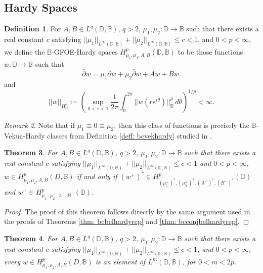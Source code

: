 \documentclass[12pt,reqno]{amsart}
\newtheorem{theorem}{Theorem}[section]
\theoremstyle{definition}
\newtheorem{deff}[theorem]{Definition}
\theoremstyle{remark}
\newtheorem{comm}[theorem]{Remark}
\newcommand{\p}{\partial}
\newcommand{\dbar}{\bar\partial}
\newcommand{\bc}{\mathbb{B}}
\newcommand{\disk}{\mathbb{D}}
\begin{document}
    \subsection{Hardy Spaces}

\begin{deff}
For $A, B \in L^q(\disk,\bc)$, $q>2$, $\mu_1,\mu_2 : \disk \to \bc$ such that there exists a real constant $c$ satisfying $||\mu_1||_{L^\infty(\disk,\bc)}+||\mu_2||_{L^\infty(\disk,\bc)} \leq c < 1$, and $0 < p < \infty$, we define the $\bc$-GFOE-Hardy spaces $H^p_{\mu_1, \mu_2, A, B}(\disk,\bc)$ to be those functions $w: \disk\to\bc$ such that 
    \[
        \dbar w = \mu_1  \p w + \mu_2 \dbar \overline{w} + Aw + B\overline{w}.
    \]
and 
    \[
        ||w||_{H^p_{\bc}} := \left( \sup_{0< r < 1} \frac{1}{2\pi}\int_0^{2\pi} ||w(re^{i\theta})||_{\bc}^p\,d\theta\right)^{1/p} < \infty.
    \]
\end{deff}

\begin{comm}
    Note that if $\mu_1 \equiv 0 \equiv \mu_2$, then this class of functions is precisely the $\bc$-Vekua-Hardy classes from Definition \ref{deff: bcvekhardy} studied in \cite{BCHoiv, BCHarmVek}.
\end{comm}

\begin{theorem}\label{thm: bcgfoehardyrep}
    For $A, B \in L^q(\disk,\bc)$, $q>2$, $\mu_1,\mu_2 : \disk \to \bc$ such that there exists a real constant $c$ satisfying $||\mu_1||_{L^\infty(\disk,\bc)}+||\mu_2||_{L^\infty(\disk,\bc)} \leq c < 1$ and $0 < p < \infty$, $w \in H^p_{\mu_1,\mu_2,A,B}(D,\bc)$ if and only if $(w^+)^* \in H^p_{(\mu_1^+)^*, (\mu_2^+)^*, (A^+)^*, (B^+)^*}(\disk)$ and $w^- \in H^p_{\mu_1^-, \mu_2^-, A^-, B^-}(\disk)$. 
\end{theorem}

\begin{proof}
The proof of this theorem follows directly by the same argument used in the proofs of Theorems \ref{thm: bcbelhardyrep} and \ref{thm: bcconjbelhardyrep}. 
\end{proof}


 

\begin{theorem}
For $A, B \in L^q(\disk,\bc)$, $q>2$, $\mu_1,\mu_2 : \disk \to \bc$ such that there exists a real constant $c$ satisfying $||\mu_1||_{L^\infty(\disk,\bc)}+||\mu_2||_{L^\infty(\disk,\bc)} \leq c < 1$, and $0 < p < \infty$, every $w \in H^p_{\mu_1,\mu_2,A,B}(D,\bc)$ is an element of $L^m(\disk,\bc)$, for $0 < m < 2p$. 
\end{theorem}
\end{document}
